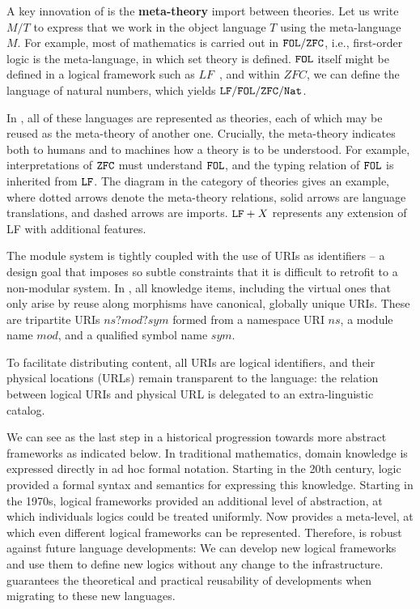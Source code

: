 A key innovation of {\mmt} is the \textbf{meta-theory} import between theories.
Let us write $M/T$ to express that we work in the object language $T$ using the meta-language $M$.
For example, most of mathematics is carried out in $\mathtt{FOL}/\mathtt{ZFC}$, i.e., first-order logic is the meta-language, in which set theory is defined.
$\mathtt{FOL}$ itself might be defined in a logical framework such as $LF$~\cite{lf}, and within $ZFC$, we can define the language of natural numbers, which yields $\mathtt{LF}/\mathtt{FOL}/\mathtt{ZFC}/\mathtt{Nat}$.

In {\mmt}, all of these languages are represented as theories, each of which may be reused as the meta-theory of another one.
Crucially, the meta-theory indicates both to humans and to machines how a theory is to be understood.
For example, interpretations of $\mathtt{ZFC}$ must understand $\mathtt{FOL}$, and the typing relation of $\mathtt{FOL}$ is inherited from $\mathtt{LF}$.
The diagram in the category of \mmt theories gives an example, where dotted arrows denote the meta-theory relations, solid arrows are language translations, and dashed arrows are imports.
$\mathtt{LF}+X$ represents any extension of LF with additional features.

The module system is tightly coupled with the use of URIs as identifiers -- a design goal that imposes so subtle constraints that it is difficult to retrofit to a non-modular system.
In {\mmt}, all knowledge items, including the virtual ones that only arise by reuse along morphisms have canonical, globally unique URIs.
These are tripartite URIs $ns?mod?sym$ formed from a namespace URI $ns$, a module name $mod$, and a qualified symbol name $sym$.

To facilitate distributing {\mmt} content, all {\mmt} URIs are logical identifiers, and their physical locations (URLs) remain transparent to the {\mmt} language: the relation between logical URIs and physical URL is delegated to an extra-linguistic catalog.
\medskip

We can see {\mmt} as the last step in a historical progression towards more abstract frameworks as indicated below.
In traditional mathematics, domain knowledge is expressed directly in ad hoc formal notation.
Starting in the 20th century, logic provided a formal syntax and semantics for expressing this knowledge.
Starting in the 1970s, logical frameworks provided an additional level of abstraction, at which individuals logics could be treated uniformly.
Now {\mmt} provides a meta-level, at which even different logical frameworks can be represented.
Therefore, {\mmt} is robust against future language developments: We can develop new logical frameworks and use them to define new logics without any change to the {\mmt} infrastructure.
{\mmt} guarantees the theoretical and practical reusability of developments when migrating to these new languages.


